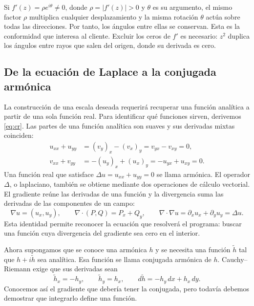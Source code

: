 Si $f'(z)=\rho e^{i\theta}\ne0$, donde $\rho=|f'(z)|>0$ y $\theta$ es su argumento, el mismo factor $\rho$ multiplica cualquier desplazamiento y la misma rotación $\theta$ actúa sobre todas las direcciones. Por tanto, los ángulos entre ellas se conservan. Esta es la conformidad que interesa al cliente. Excluir los ceros de $f'$ es necesario: $z^2$ duplica los ángulos entre rayos que salen del origen, donde su derivada es cero.

\subsection{De la ecuación de Laplace a la conjugada armónica}
La construcción de una escala deseada requerirá recuperar una función analítica a partir de una sola función real. Para identificar qué funciones sirven, derivemos \eqref{eq:cr}. Las partes de una función analítica son suaves y sus derivadas mixtas coinciden:
\begin{equation}
 \begin{aligned}
 u_{xx}+u_{yy}&=(v_y)_x-(v_x)_y=v_{yx}-v_{xy}=0,\\
 v_{xx}+v_{yy}&=-(u_y)_x+(u_x)_y=-u_{yx}+u_{xy}=0.
 \end{aligned}\label{eq:laplace}
\end{equation}
Una función real que satisface $\Delta u=u_{xx}+u_{yy}=0$ se llama armónica. El operador $\Delta$, o laplaciano, también se obtiene mediante dos operaciones de cálculo vectorial. El gradiente reúne las derivadas de una función y la divergencia suma las derivadas de las componentes de un campo:
\begin{equation}
 \nabla u=(u_x,u_y),\qquad
 \nabla\!\cdot(P,Q)=P_x+Q_y,\qquad
 \nabla\!\cdot\nabla u=\partial_xu_x+\partial_yu_y=\Delta u.
 \label{eq:divergencia}
\end{equation}
Esta identidad permite reconocer la ecuación que resolverá el programa: buscar una función cuya divergencia del gradiente sea cero en el interior.

Ahora supongamos que se conoce una armónica $h$ y se necesita una función $\widetilde h$ tal que $h+i\widetilde h$ sea analítica. Esa función se llama conjugada armónica de $h$. Cauchy--Riemann exige que sus derivadas sean
\begin{equation}
 \widetilde h_x=-h_y,\qquad \widetilde h_y=h_x,
 \qquad d\widetilde h=-h_y\,dx+h_x\,dy.
 \label{eq:conjugada}
\end{equation}
Conocemos así el gradiente que debería tener la conjugada, pero todavía debemos demostrar que integrarlo define una función.

